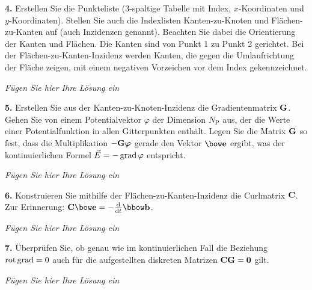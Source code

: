 \documentclass[Protokollheft.tex]{subfiles}
\begin{document}
        \begin{framed}
	\noindent \textbf{4.} Erstellen Sie die Punkteliste (3-spaltige Tabelle mit Index, $x$-Koordinaten und $y$-Koordinaten). Stellen Sie auch die Indexlisten Kanten-zu-Knoten und Flächen-zu-Kanten auf (auch Inzidenzen genannt).
                    Beachten Sie dabei die Orientierung der Kanten und Flächen. Die Kanten sind von Punkt 1
                    zu Punkt 2 gerichtet. Bei der Flächen-zu-Kanten-Inzidenz werden Kanten, die gegen die
                    Umlaufrichtung der Fläche zeigen, mit einem negativen Vorzeichen vor dem Index gekennzeichnet.\label{exer:incidences}
\end{framed}

\emph{Fügen Sie hier Ihre Lösung ein}

        \begin{framed}
	\noindent \textbf{5.} Erstellen Sie aus der Kanten-zu-Knoten-Inzidenz die Gradientenmatrix $\mathbf{G}$.
                    Gehen Sie von einem Potentialvektor {\boldmath $\varphi$}
                    der Dimension $N_\text{P}$ aus, der die Werte einer
                    Potentialfunktion in allen Gitterpunkten enthält. Legen Sie
                    die Matrix $\mathbf{G}$ so fest, dass die Multiplikation $-\mbox{\boldmath
                    $\mathbf{G} \varphi$}$ gerade den Vektor $\efit$ ergibt, was der
                    kontinuierlichen Formel $\vec{E}=-\operatorname{grad}\varphi$ entspricht.\label{exer:gradfit}
\end{framed}

\emph{Fügen Sie hier Ihre Lösung ein}

        \begin{framed}
	\noindent \textbf{6.} Konstruieren Sie mithilfe der Flächen-zu-Kanten-Inzidenz die Curlmatrix $\mathbf{C}$.\\
              Zur Erinnerung: $\curlfit \efit = - \frac{\text{d}}{\text{d}t} \bfit$.\label{exer:curlfit}
\end{framed}

\emph{Fügen Sie hier Ihre Lösung ein}

        \begin{framed}
	\noindent \textbf{7.} Überprüfen Sie, ob genau wie im kontinuierlichen Fall die Beziehung $\operatorname{rot}\operatorname{grad}=0$ auch für die aufgestellten diskreten Matrizen $\mathbf{C}\mathbf{G}={\textbf{0}}$ gilt.\label{exer:rotgradZero}
\end{framed}

\emph{Fügen Sie hier Ihre Lösung ein}
\end{document}
